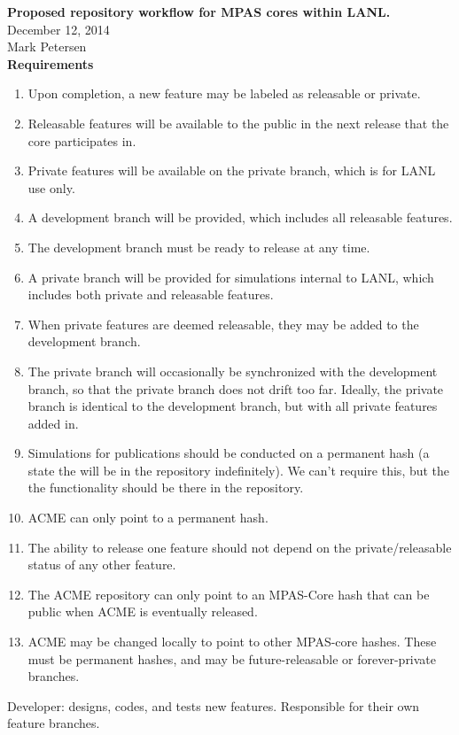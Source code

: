 \documentclass[11pt]{article}
\begin{document}
{\bf Proposed repository workflow for MPAS cores within LANL.}\\
December 12, 2014\\
Mark Petersen\\

{\bf Requirements}
\begin{enumerate}
\item Upon completion, a new feature may be labeled as releasable or private.
\item Releasable features will be available to the public in the next release that the core participates in.
\item Private features will be available on the private branch, which is for LANL use only.
\item A development branch will be provided, which includes all releasable features.  
\item The development branch must be ready to release at any time.
\item A private branch will be provided for simulations internal to LANL, which includes both private and releasable features.
\item When private features are deemed releasable, they may be added to the development branch.
\item The private branch will occasionally be synchronized with the development branch, so that the private branch does not drift too far.  Ideally, the private branch is identical to the development branch, but with all private features added in.
\item Simulations for publications should be conducted on a permanent hash (a state the will be in the repository indefinitely).  We can't require this, but the the functionality should be there in the repository.
\item ACME can only point to a permanent hash.
\item The ability to release one feature should not depend on the private/releasable status of any other feature.
\item The ACME repository can only point to an MPAS-Core hash that can be public when ACME is eventually released.
\item ACME may be changed locally to point to other MPAS-core hashes.  These must be permanent hashes, and may be future-releasable or forever-private branches.
\end{enumerate}

\clearpage

Developer: designs, codes, and tests new features.  Responsible for their own feature branches.
\end{document}
